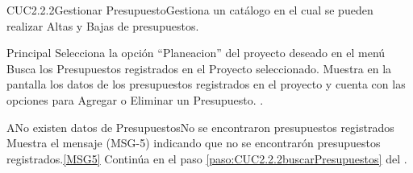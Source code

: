 %  
	\begin{UseCase}{CUC2.2.2}{Gestionar Presupuesto}{Gestiona un catálogo en el cual se pueden realizar Altas y Bajas de presupuestos.}
	\end{UseCase}
		
	\begin{UCtrayectoria}{Principal}
		\UCpaso[\UCactor] Selecciona la opción ``Planeacion'' del proyecto deseado en el menú  
		\UCpaso Busca los Presupuestos registrados en el Proyecto seleccionado. \label{paso:CUC2.2.2buscarPresupuestos}
		\UCpaso Muestra en la pantalla  los datos de los presupuestos registrados en el proyecto y cuenta con las opciones para Agregar o Eliminar un Presupuesto.  .
	\end{UCtrayectoria}
	
	\begin{UCtrayectoriaA}{A}{No existen datos de Presupuestos}{No se encontraron presupuestos registrados}
			\UCpaso[\UCactor] Muestra el mensaje (MSG-5) indicando que no se encontrarón presupuestos registrados.\ref{MSG5}
			\UCpaso Continúa en el paso \ref{paso:CUC2.2.2buscarPresupuestos} del .
	\end{UCtrayectoriaA}


